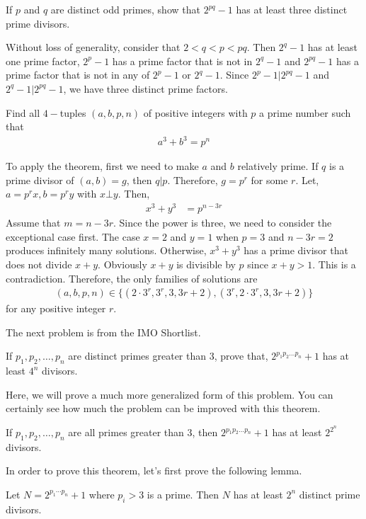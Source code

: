 	\begin{problem}
		If $p$ and $q$ are distinct odd primes, show that $2^{pq}-1$ has at least three distinct prime divisors.
	\end{problem}

	\begin{solution}
		Without loss of generality, consider that $2<q<p<pq$. Then $2^q-1$ has at least one prime factor, $2^p-1$ has a prime factor that is not in $2^q-1$ and $2^{pq}-1$ has a prime factor that is not in any of $2^p-1$ or $2^q-1$. Since $2^p-1|2^{pq}-1$ and $2^{q}-1|2^{pq}-1$, we have three distinct prime factors.
	\end{solution}


	\begin{problem}
		Find all $4-$tuples $(a,b,p,n)$ of positive integers with $p$ a prime number such that
			\begin{align*}
				a^3+b^3=p^n
			\end{align*}
	\end{problem}

	\begin{solution}
		To apply the theorem, first we need to make $a$ and $b$ relatively prime. If $q$ is a prime divisor of $(a,b)=g$, then $q|p$. Therefore, $g=p^r$ for some $r$. Let, $a=p^rx,b=p^ry$ with $x\bot y$. Then,
			\begin{align*}
				x^3+y^3 & = p^{n-3r}
			\end{align*}
		Assume that $m=n-3r$. Since the power is three, we need to consider the exceptional case first. The case $x=2$ and $y=1$ when $p=3$ and $n-3r=2$ produces infinitely many solutions. Otherwise, $x^3+y^3$ has a prime divisor that does not divide $x+y$. Obviously $x+y$ is divisible by $p$ since $x+y>1$. This is a contradiction. Therefore, the only families of solutions are
			\begin{align*}
				(a,b,p,n)\in\{(2\cdot 3^r,3^r,3,3r+2),(3^r,2\cdot 3^r,3,3r+2)\}
			\end{align*}
		for any positive integer $r$.
	\end{solution}

The next problem is from the IMO Shortlist.
	\begin{problem}
		If $p_1,p_2,\dots,p_n$ are distinct primes greater than $3$, prove that, $2^{p_1p_2\dots p_n}+1$ has at least $4^n$ divisors.
	\end{problem}
Here, we will prove a much more generalized form of this problem.  You can certainly see how much the problem can be improved with this theorem.
	\begin{theorem}
		If $p_1,p_2,\dots,p_n$ are all primes greater than $3$, then $2^{p_1p_2\dots p_n}+1$ has at least $2^{2^n}$ divisors.
	\end{theorem}
In order to prove this theorem, let's first prove the following lemma.
	\begin{lemma}
		Let $N=2^{p_1\cdots p_n}+1$ where $p_i>3$ is a prime. Then $N$ has at least $2^n$ distinct prime divisors.
	\end{lemma}

